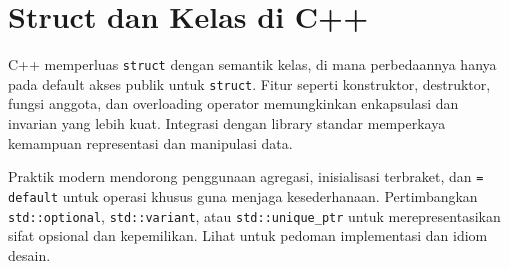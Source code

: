 \documentclass[../main.tex]{subfiles}
\begin{document}
\section{Struct dan Kelas di C++}
C++ memperluas \texttt{struct} dengan semantik kelas, di mana perbedaannya hanya pada default akses publik untuk \texttt{struct}. Fitur seperti konstruktor, destruktor, fungsi anggota, dan overloading operator memungkinkan enkapsulasi dan invarian yang lebih kuat. Integrasi dengan library standar memperkaya kemampuan representasi dan manipulasi data.

Praktik modern mendorong penggunaan agregasi, inisialisasi terbraket, dan \texttt{= default} untuk operasi khusus guna menjaga kesederhanaan. Pertimbangkan \texttt{std::optional}, \texttt{std::variant}, atau \texttt{std::unique_ptr} untuk merepresentasikan sifat opsional dan kepemilikan. Lihat \textcite{cpp-struct-class,cpp-reference} untuk pedoman implementasi dan idiom desain.
\end{document}
